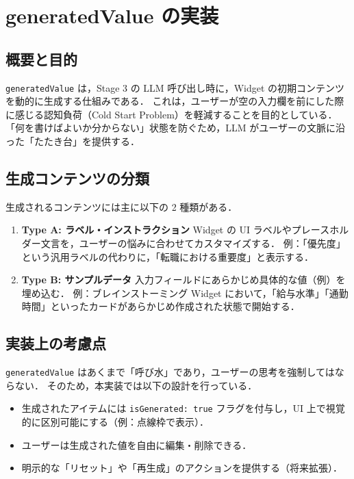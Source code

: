 \documentclass[senior,final,11pt,dvipdfmx]{iputit-thesis}
\begin{document}
\section{generatedValue の実装}

\subsection{概要と目的}
\texttt{generatedValue} は，Stage 3 の LLM 呼び出し時に，Widget の初期コンテンツを動的に生成する仕組みである．
これは，ユーザーが空の入力欄を前にした際に感じる認知負荷（Cold Start Problem）を軽減することを目的としている．
「何を書けばよいか分からない」状態を防ぐため，LLM がユーザーの文脈に沿った「たたき台」を提供する．

\subsection{生成コンテンツの分類}
生成されるコンテンツには主に以下の 2 種類がある．

\begin{enumerate}
  \item \textbf{Type A: ラベル・インストラクション}
    Widget の UI ラベルやプレースホルダー文言を，ユーザーの悩みに合わせてカスタマイズする．
    例：「優先度」という汎用ラベルの代わりに，「転職における重要度」と表示する．
  \item \textbf{Type B: サンプルデータ}
    入力フィールドにあらかじめ具体的な値（例）を埋め込む．
    例：ブレインストーミング Widget において，「給与水準」「通勤時間」といったカードがあらかじめ作成された状態で開始する．
\end{enumerate}

\subsection{実装上の考慮点}
\texttt{generatedValue}  はあくまで「呼び水」であり，ユーザーの思考を強制してはならない．
そのため，本実装では以下の設計を行っている．
\begin{itemize}
  \item 生成されたアイテムには \texttt{isGenerated: true} フラグを付与し，UI 上で視覚的に区別可能にする（例：点線枠で表示）．
  \item ユーザーは生成された値を自由に編集・削除できる．
  \item 明示的な「リセット」や「再生成」のアクションを提供する（将来拡張）．
\end{itemize}
\end{document}
